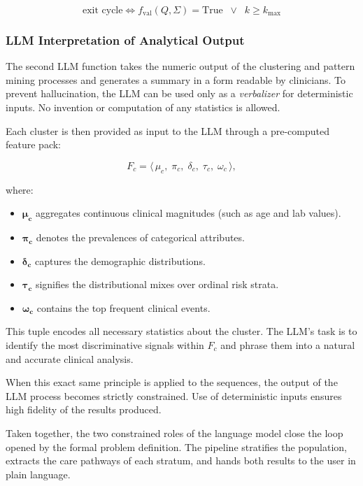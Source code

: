 \begin{equation}
    \text{exit cycle} \iff f_{\mathrm{val}}(Q,\Sigma) = \mathrm{True} \;\;\lor\;\; k \ge k_{\max}
    \label{eq:exit}
\end{equation}

\subsubsection*{LLM Interpretation of Analytical Output}

The second LLM function takes the numeric output of the clustering and pattern mining processes and generates a summary in a form readable by clinicians. To prevent hallucination, the LLM can be used only as a \emph{verbalizer} for deterministic inputs. No invention or computation of any statistics is allowed.

Each cluster is then provided as input to the LLM through a pre-computed feature pack:

\begin{equation}
    F_c = \langle\, \mu_c,\; \pi_c,\; \delta_c,\; \tau_c,\; \omega_c \,\rangle,
    \label{eq:feature_pack}
\end{equation}

where:
\begin{itemize}
    \item $\boldsymbol{\mu_c}$ aggregates continuous clinical magnitudes (such as age and lab values).
    \item $\boldsymbol{\pi_c}$ denotes the prevalences of categorical attributes.
    \item $\boldsymbol{\delta_c}$ captures the demographic distributions.
    \item $\boldsymbol{\tau_c}$ signifies the distributional mixes over ordinal risk strata.
    \item $\boldsymbol{\omega_c}$ contains the top frequent clinical events.
\end{itemize}

This tuple encodes all necessary statistics about the cluster. The LLM's task is to identify the most discriminative signals within $F_c$ and phrase them into a natural and accurate clinical analysis.

When this exact same principle is applied to the sequences, the output of the LLM process becomes strictly constrained. Use of deterministic inputs ensures high fidelity of the results produced.

Taken together, the two constrained roles of the language model close the loop opened by the formal problem definition. The pipeline stratifies the population, extracts the care pathways of each stratum, and hands both results to the user in plain language.
